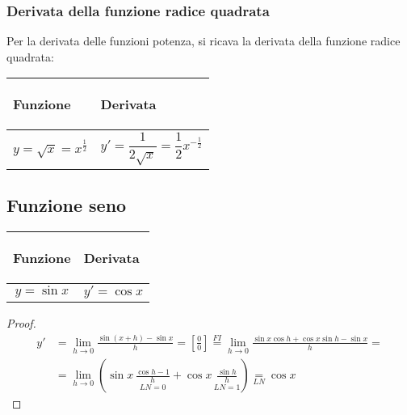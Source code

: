 \documentclass{book}     %
\begin{document}
\subsubsection{Derivata della funzione radice quadrata}
Per la derivata delle funzioni potenza, si ricava la derivata della funzione radice quadrata:
\begin{center}
    \begin{tabular}{m{}|m{}}
        \begin{center}
            \textbf{Funzione}
        \end{center}
        & 
        \begin{center}
            \textbf{Derivata}
        \end{center}\\
        \hline
            \[y=\sqrt{x}=x^{\frac{1}{2}}\] &
            \[y'=\frac{1}{2\sqrt{x}} = \frac{1}{2}x ^{-\frac{1}{2}}\]
    \end{tabular}
\end{center}

\subsection{Funzione seno}
\begin{center}
    \begin{tabular}{m{}|m{}}
        \begin{center}
            \textbf{Funzione}
        \end{center}
        & 
        \begin{center}
            \textbf{Derivata}
        \end{center}\\
        \hline
            \[y=\sin x\]&
            \[y'=\cos x\]
    \end{tabular}
\end{center}
\begin{proof}
    \[\begin{aligned}y'&=\lim_{h\to 0}\frac{\sin(x+h)-\sin x}{h}=\left[ \frac{0}{0} \right]\overset{FI}{=}\lim_{h\to 0}\frac{\sin x \cos h + \cos x \sin h - \sin x}{h}=\\&=\lim_{h\to 0}\left(\sin x\,\underset{LN=0}{\boxed{\frac{\cos h-1}{h}}}+\cos x\,\underset{LN=1}{\boxed{\frac{\sin h}{h}}}\right)\underset{LN}=\cos x\end{aligned}\]
\end{proof}
\end{document}
